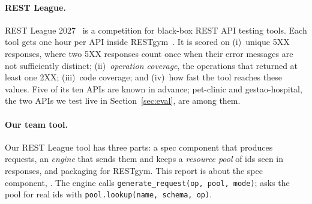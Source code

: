 \paragraph{REST League.} REST League 2027~\cite{restleague} is a competition
for black-box REST API testing tools. Each tool gets one hour per API inside
RESTgym~\cite{restgym}. It is scored on (i)~unique 5XX responses, where two
5XX responses count once when their error messages are not sufficiently
distinct; (ii)~\emph{operation coverage}, the operations that returned at
least one 2XX; (iii)~code coverage; and (iv)~how fast the tool reaches these
values. Five of its ten APIs are known in advance; pet-clinic and
gestao-hospital, the two APIs we test live in Section~\ref{sec:eval}, are
among them.

\paragraph{Our team tool.} Our REST League tool has three parts: a spec
component that produces requests, an \emph{engine} that sends them and keeps a
\emph{resource pool} of ids seen in responses, and packaging for RESTgym.
This report is about the spec component, \tool. The engine calls
\texttt{generate\_request(op, pool, mode)}; \tool asks the pool for real
ids with \texttt{pool.lookup(name, schema, op)}.
